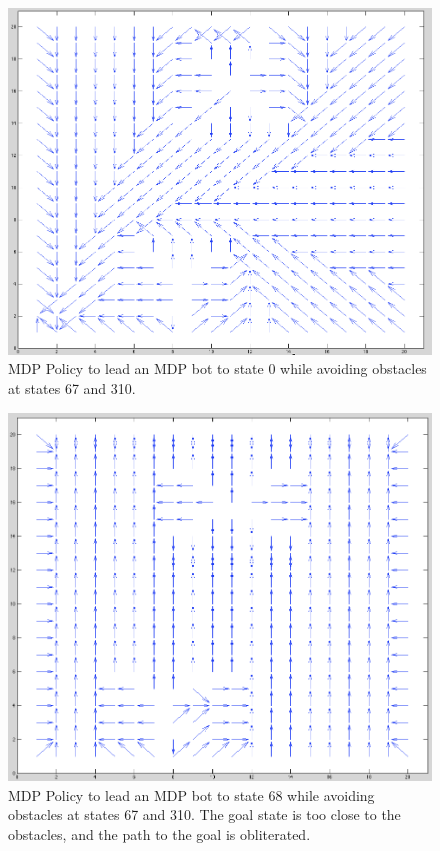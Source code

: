 \documentclass{aiaa-tc}%
\begin{document}
 \begin{figure}[htbp]
   \centering
   \includegraphics[width=170mm]{mpd_noisy_obstacles.png} 
   \caption{MDP Policy to lead an MDP bot to state 0 while avoiding obstacles at states 67 and 310.}
   \label{fig:sample}
\end{figure}
 \begin{figure}[htbp]
   \centering
   \includegraphics[width=170mm]{mdp_proximity_error.png} 
   \caption{MDP Policy to lead an MDP bot to state 68 while avoiding obstacles at states 67 and 310. The goal state is too close to the obstacles, and the path to the goal is obliterated.}
   \label{fig:sample}
\end{figure}
\end{document}
